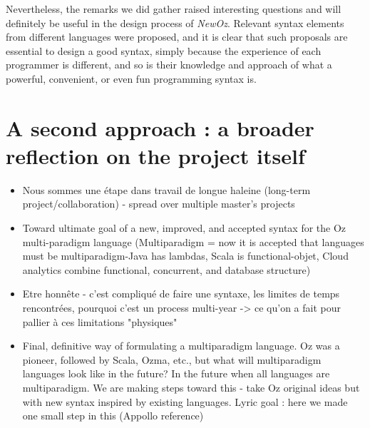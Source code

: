 Nevertheless, the remarks we did gather raised interesting questions and will definitely be useful in the design process of \textit{NewOz}.
Relevant syntax elements from different languages were proposed, and it is clear that such proposals are essential to design a good syntax, simply because the experience of each programmer is different, and so is their knowledge and approach of what a powerful, convenient, or even fun programming syntax is.

\section{A second approach : a broader reflection on the project itself}\label{sec:ch4-reflection}
\begin{itemize}
\item Nous sommes une étape dans travail de longue haleine (long-term project/collaboration) - spread over multiple master's projects
\item Toward ultimate goal of a new, improved, and accepted syntax for the Oz multi-paradigm language (Multiparadigm = now it is accepted that languages must be multiparadigm-Java has lambdas, Scala is functional-objet, Cloud analytics combine functional, concurrent, and database structure)
\item Etre honnête - c'est compliqué de faire une syntaxe, les limites de temps rencontrées, pourquoi c'est un process multi-year -> ce qu'on a fait pour pallier à ces limitations "physiques"
\item Final, definitive way of formulating a multiparadigm language.  Oz was a pioneer, followed by Scala, Ozma, etc., but what will multiparadigm languages look like in the future?  In the future when all languages are multiparadigm. We are making steps toward this - take Oz original ideas but with new syntax inspired by existing languages. Lyric goal : here we made one small step in this (Appollo reference)
\end{itemize}
